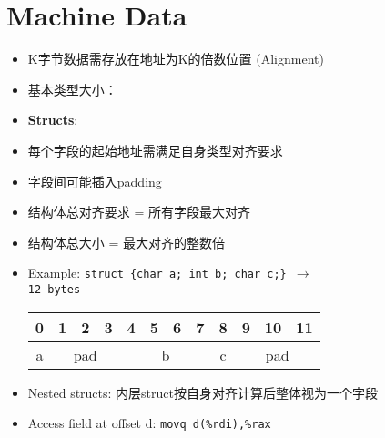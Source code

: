 \section{Machine Data}
\begin{itemize}[nosep]
    \item K字节数据需存放在地址为K的倍数位置 (Alignment)
    \item 基本类型大小：
\end{itemize}
\begin{itemize}[nosep]
    \item \textbf{Structs}:
    \item 每个字段的起始地址需满足自身类型对齐要求
    \item 字段间可能插入padding
    \item 结构体总对齐要求 = 所有字段最大对齐
    \item 结构体总大小 = 最大对齐的整数倍
    \item Example: \tt{struct \{char a; int b; char c;\}} $\rightarrow$ \\12 bytes
      \begin{tabular}{|c|c|c|c|c|c|c|c|c|c|c|c|} \hline
        0 & 1 & 2 & 3 & 4 & 5 & 6 & 7 & 8 & 9 & 10 & 11 \\ \hline
        a & \multicolumn{3}{c|}{pad} & \multicolumn{4}{c|}{b} & c & \multicolumn{3}{c|}{pad} \\ \hline
      \end{tabular}
    \item Nested structs: 内层struct按自身对齐计算后整体视为一个字段
    \item Access field at offset d: \tt{movq d(\%rdi),\%rax}
\end{itemize}
